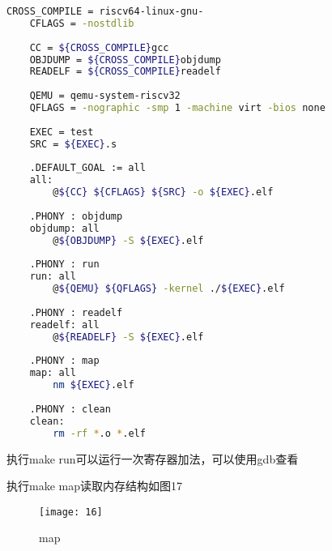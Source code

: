 \documentclass{source/Report}
\begin{document}
\begin{lstlisting}[language = bash, title = {makefile}]
    CROSS_COMPILE = riscv64-linux-gnu-
    CFLAGS = -nostdlib
    
    CC = ${CROSS_COMPILE}gcc
    OBJDUMP = ${CROSS_COMPILE}objdump
    READELF = ${CROSS_COMPILE}readelf
    
    QEMU = qemu-system-riscv32
    QFLAGS = -nographic -smp 1 -machine virt -bios none
    
    EXEC = test
    SRC = ${EXEC}.s
    
    .DEFAULT_GOAL := all
    all:
        @${CC} ${CFLAGS} ${SRC} -o ${EXEC}.elf
    
    .PHONY : objdump
    objdump: all
        @${OBJDUMP} -S ${EXEC}.elf
    
    .PHONY : run
    run: all
        @${QEMU} ${QFLAGS} -kernel ./${EXEC}.elf
    
    .PHONY : readelf
    readelf: all
        @${READELF} -S ${EXEC}.elf
    
    .PHONY : map
    map: all
        nm ${EXEC}.elf
    
    .PHONY : clean
    clean:
        rm -rf *.o *.elf
\end{lstlisting}

执行make run可以运行一次寄存器加法，可以使用gdb查看

执行make map读取内存结构如图17

\begin{figure}[p]
    \centering
    \texttt{[image: 16]}
    \caption{map}
\end{figure}
\end{document}
